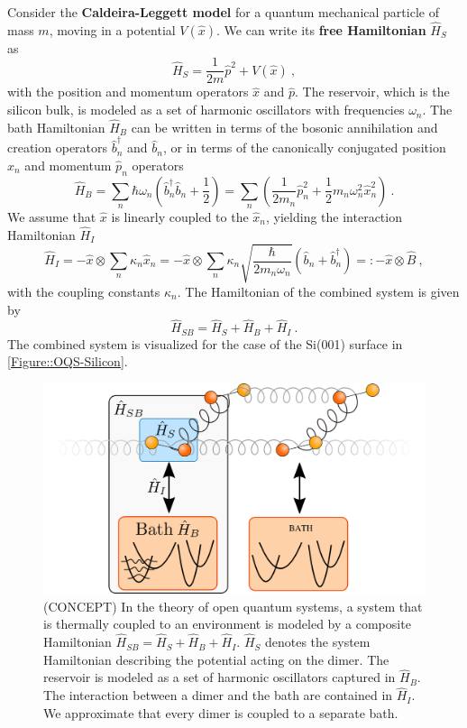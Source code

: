 	Consider the \textbf{Caldeira-Leggett model} \cite{caldeira1981influence} for a quantum mechanical particle of mass $m$, moving in a potential $V(\hat{x})$. We can write its \textbf{free Hamiltonian} $\hat{H}_S$ as
	\begin{equation}
		\hat{H}_S =	\frac{1}{2m} \hat{p}^2 + V(\hat{x})~,
	\end{equation}
	with the position and momentum operators $\hat{x}$ and $\hat{p}$. The reservoir, which is the silicon bulk, is modeled as a set of harmonic oscillators with frequencies $\omega_n$. The bath Hamiltonian $\hat{H}_B$ can be written in terms of the bosonic annihilation and creation operators $\hat{b}_n^\dagger$ and $\hat{b}_n$, or in terms of the canonically conjugated position $\hat{x}_n$ and momentum $\hat{p}_n$ operators
	\begin{equation}
		\hat{H}_B =	\sum_n \hbar \omega_n \left(\hat{b}_n^\dagger \hat{b}_n + \frac{1}{2} \right) =	\sum_n \left(\frac{1}{2 m_n} \hat{p}_n^2 + \frac{1}{2} m_n \omega_n^2 \hat{x}_n^2 \right)~.
	\end{equation}
	We assume that $\hat{x}$ is linearly coupled to the $\hat{x}_n$, yielding the interaction Hamiltonian $\hat{H}_I$
	\begin{equation}
		\hat{H}_I =	- \hat{x} \otimes \sum_n \kappa_n \hat{x}_n =	-\hat{x} \otimes \sum_n \kappa_n \sqrt{\frac{\hbar}{2 m_n \omega_n}} \left(\hat{b}_n + \hat{b}_n^\dagger\right) =:	- \hat{x} \otimes \hat{B} ~,
	\end{equation}
	with the coupling constants $\kappa_n$. The Hamiltonian of the combined system is given by
	\begin{equation}
		\hat{H}_{SB} = \hat{H}_S + \hat{H}_B + \hat{H}_I~.
	\end{equation}
	The combined system is visualized for the case of the Si(001) surface in \autoref{Figure::OQS-Silicon}.
	\begin{figure}[tp]
		\centering
		\includegraphics[width=0.8\linewidth]{graphics/OQS-Silicon.png}
		\caption{(CONCEPT) In the theory of open quantum systems, a system that is thermally coupled to an environment is modeled by a composite Hamiltonian $\hat{H}_{SB} =	\hat{H}_S + \hat{H}_B + \hat{H}_I$. $\hat{H}_S$ denotes the system Hamiltonian describing the potential acting on the dimer. The reservoir is modeled as a set of harmonic oscillators captured in $\hat{H}_B$. The interaction between a dimer and the bath are contained in $\hat{H}_I$. We approximate that every dimer is coupled to a separate bath.}
		\label{Figure::OQS-Silicon}
	\end{figure}
